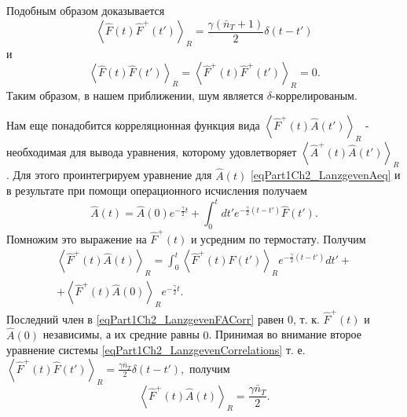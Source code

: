 Подобным образом доказывается
\begin{equation}
\left<\hat{F}\left(t\right)\hat{F}^{+}\left(t'\right)\right>_R = 
\frac{\gamma\left(\bar{n}_{T} + 1\right)}{2} \delta\left(t - t'\right)
\label{eqPart1Ch2_Lanzgeven_Task1}
\end{equation}
и
\begin{equation}
\left<\hat{F}\left(t\right)\hat{F}\left(t'\right)\right>_R = 
\left<\hat{F}^{+}\left(t\right)\hat{F}^{+}\left(t'\right)\right>_R = 0.
\label{eqPart1Ch2_Lanzgeven_Task2}
\end{equation}
Таким образом, в нашем приближении, шум является
$\delta$-коррелированым.

Нам еще понадобится корреляционная функция вида
\(
\left<\hat{F}^{+}\left(t\right)\hat{A}\left(t'\right)\right>_R 
\) 
- необходимая для вывода уравнения, которому удовлетворяет 
\(
\left<\hat{A}^{+}\left(t\right)\hat{A}\left(t'\right)\right>_R 
\). Для этого проинтегрируем уравнение для $\hat{A}\left(t\right)$
\eqref{eqPart1Ch2_LanzgevenAeq} и в результате при помощи
операционного исчисления получаем
\begin{equation} 
\hat{A}\left(t\right) = \hat{A}\left(0\right)e^{-\frac{\gamma}{2}t} +
\int_0^t d t' e^{-\frac{\gamma}{2}\left(t - t'\right)} \hat{F}\left(t'\right).
\nonumber
\end{equation} 
Помножим это выражение на $\hat{F}^{+}\left(t\right)$ и усредним по
термостату. Получим
\begin{eqnarray} 
\left<\hat{F}^{+}\left(t\right)\hat{A}\left(t\right)\right>_R = 
\int_0^t  
\left<\hat{F}^{+}\left(t\right)\hat{F}\left(t'\right)\right>_R 
e^{-\frac{\gamma}{2}\left(t - t'\right)}
d t' +
\nonumber \\
+ \left<\hat{F}^{+}\left(t\right)\hat{A}\left(0\right)\right>_R e^{-\frac{\gamma}{2}t}.
\label{eqPart1Ch2_LanzgevenFACorr}
\end{eqnarray} 
Последний член в \eqref{eqPart1Ch2_LanzgevenFACorr} равен $0$, т. к. 
$\hat{F}^{+}\left(t\right)$ и $\hat{A}\left(0\right)$ независимы,
 а их средние равны $0$. Принимая во внимание второе уравнение системы 
\eqref{eqPart1Ch2_LanzgevenCorrelations} т. е.
\(
\left<\hat{F}^{+}\left(t\right)\hat{F}\left(t'\right)\right>_R = 
\frac{\gamma \bar{n}_{T}}{2} \delta\left(t - t'\right),
\)
получим
\begin{equation}
\left<\hat{F}^{+}\left(t\right)\hat{A}\left(t\right)\right>_R = 
\frac{\gamma \bar{n}_{T}}{2}.
\nonumber
\end{equation}
